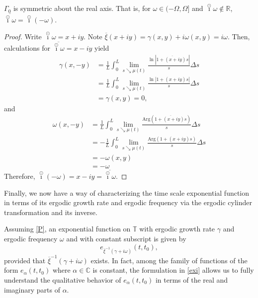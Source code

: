\documentclass[reqno]{amsart}
\begin{document}
\begin{proposition}
\label{prop:negCon}
$\Gamma_0$ is symmetric about the real axis. That is, for $\omega \in (-\Omega,\Omega]$
and $\overset{\odot}{\imath} \omega \not \in \mathbb{R}$, $\overline{\overset{\odot}{\imath} \omega} = \overset{\odot}{\imath} (-\omega)$.
\end{proposition}

\begin{proof}
Write $\overset{\odot}{\imath} \omega = x+iy$. Note $\overline{\xi}(x+iy) = \gamma(x,y) + i \omega(x,y) = i\omega$.
Then, calculations for $\overline{\overset{\odot}{\imath} \omega} = x-iy$ yield
\begin{align*}
 \gamma(x,-y)& =\frac{1}{L}\int_{0}^{L} \lim_{s \searrow \mu(t)}\frac{\ln |\overline{1+(x+iy)s}|}{s} \Delta s \\
 & = \frac{1}{L}\int_{0}^{L} \lim_{s \searrow \mu(t)}\frac{\ln |1+(x+iy)s|}{s} \Delta s \\
 & = \gamma(x,y)
  = 0,
\end{align*}
and
\begin{align*}
 \omega(x,-y)& =\frac{1}{L}\int_{0}^{L} \lim_{s \searrow \mu(t)}\frac{\text{Arg} (\overline{1+(x+iy)s})}{s} \Delta s \\
 & = - \frac{1}{L}\int_{0}^{L} \lim_{s \searrow \mu(t)}\frac{\text{Arg} (1+(x+iy)s)}{s} \Delta s \\
 & = -\omega(x,y)\\
 & = -\omega
\end{align*}
Therefore, $\overset{\odot}{\imath} (-\omega) = x-iy = \overline{\overset{\odot}{\imath} \omega}$.
\end{proof}

Finally, we now have a way of characterizing the time scale exponential function
in terms of its ergodic growth rate and ergodic frequency via the ergodic cylinder
transformation and its inverse.

\begin{remark}
\label{rmk:bigDeal}  \rm
Assuming \eqref{P}, an exponential function on $\mathbb{T}$ with ergodic growth rate
$\gamma$ and ergodic frequency $\omega$ and with constant subscript is given by
 \begin{equation}\label{exi}
 e_{\overline{\xi}^{-1}(\gamma+i \omega)}(t,t_0),
 \end{equation}
provided that $\overline{\xi}^{-1}(\gamma+i \omega)$ exists. In fact, among the family of functions of the form $e_\alpha(t,t_0)$ where $\alpha\in\mathbb{C}$ is constant, the
formulation in \eqref{exi} allows us to fully understand the qualitative behavior of $e_\alpha(t,t_0)$ in terms of the real and imaginary parts of $\alpha$.
\end{remark}
\end{document}
